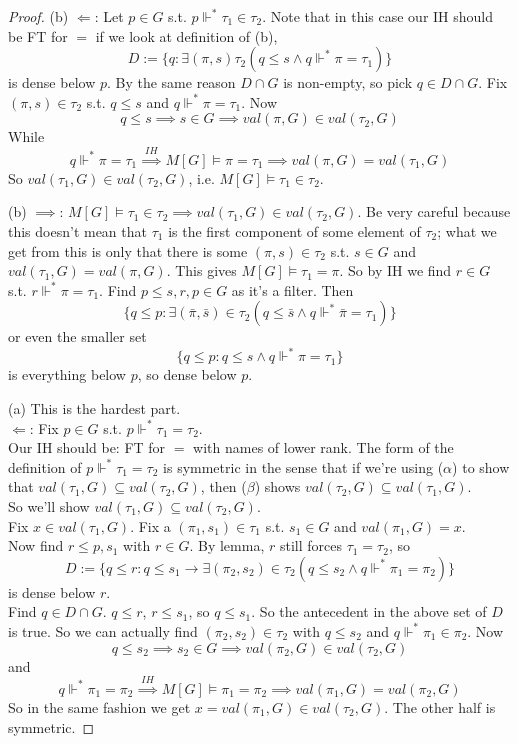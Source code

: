 \documentclass[a4paper]{article}
\begin{document}
\begin{proof}
(b) $\Leftarrow$: Let $p \in G$ s.t. $p \Vdash^* \tau_1\in\tau_2$. Note that in this case our IH should be FT for $=$ if we look at definition of (b),
\[
D:=\{q:\exists (\pi,s) \tau_2(q \leq s \wedge q \Vdash^*\pi = \tau_1)\}
\]
is dense below $p$. By the same reason $D\cap G$ is non-empty, so pick $q \in D \cap G$. Fix $(\pi,s) \in \tau_2$ s.t. $q \leq s$ and $q \Vdash^*\pi=\tau_1$. Now
\[
q \leq s \implies s \in G \implies val(\pi,G) \in val(\tau_2,G)
\]
While
\[
q \Vdash^* \pi = \tau_1 \stackrel{IH}{\implies} M[G] \vDash \pi=\tau_1 \implies val(\pi,G) = val(\tau_1,G)
\]
So $val(\tau_1,G) \in val(\tau_2,G)$, i.e. $M[G] \vDash \tau_1 \in \tau_2$.

(b) $\implies$: $M[G] \vDash \tau_1 \in \tau_2 \implies val(\tau_1,G) \in val(\tau_2,G)$. Be very careful because this doesn't mean that $\tau_1$ is the first component of some element of $\tau_2$; what we get from this is only that there is some $(\pi,s) \in \tau_2$ s.t. $s \in G$ and $val(\tau_1,G) = val(\pi,G)$. This gives $M[G] \vDash \tau_1 = \pi$. So by IH we find $r \in G$ s.t. $r \Vdash^* \pi=\tau_1$. Find $p \leq s,r, p \in G$ as it's a filter. Then
\[
\{q \leq p: \exists (\bar{\pi},\bar{s}) \in \tau_2 (q \leq \bar{s} \wedge q \Vdash^* \bar{\pi}=\tau_1)\}
\]
or even the smaller set
\[
\{q \leq p: q \leq s \wedge q \Vdash^* \pi=\tau_1\}
\]
is everything below $p$, so dense below $p$.

(a) This is the hardest part.\\
$\Leftarrow$: Fix $p \in G$ s.t. $p \Vdash^* \tau_1 = \tau_2$.\\
Our IH should be: FT for $=$ with names of lower rank. The form of the definition of $p \Vdash^* \tau_1 = \tau_2$ is symmetric in the sense that if we're using ($\alpha$) to show that $val(\tau_1,G) \subseteq val(\tau_2,G)$, then ($\beta$) shows $val(\tau_2,G) \subseteq val(\tau_1,G)$.\\
So we'll show $val(\tau_1,G) \subseteq val(\tau_2,G)$.\\
Fix $x \in val(\tau_1,G)$. Fix a $(\pi_1,s_1) \in \tau_1$ s.t. $s_1 \in G$ and $val(\pi_1,G) = x$.\\
Now find $r \leq p,s_1$ with $r \in G$. By lemma, $r$ still forces $\tau_1=\tau_2$, so
\[
D:=\{q \leq r: q \leq s_1 \to \exists (\pi_2,s_2) \in \tau_2 (q \leq s_2 \wedge q \Vdash^* \pi_1=\pi_2)\}
\]
is dense below $r$.\\
Find $q \in D \cap G$. $q \leq r$, $r \leq s_1$, so $q \leq s_1$. So the antecedent in the above set of $D$ is true. So we can actually find $(\pi_2,s_2) \in \tau_2$ with $q \leq s_2$ and $q \Vdash^* \pi_1 \in \pi_2$. Now
\[
q \leq s_2 \implies s_2 \in G \implies val(\pi_2,G) \in val(\tau_2,G)
\]
and
\[
q \Vdash^* \pi_1 = \pi_2 \stackrel{IH}{\implies} M[G] \vDash \pi_1=\pi_2 \implies val(\pi_1,G) = val(\pi_2,G)
\]
So in the same fashion we get $x=val(\pi_1,G) \in val(\tau_2,G)$. The other half is symmetric.


\end{proof}
\end{document}
